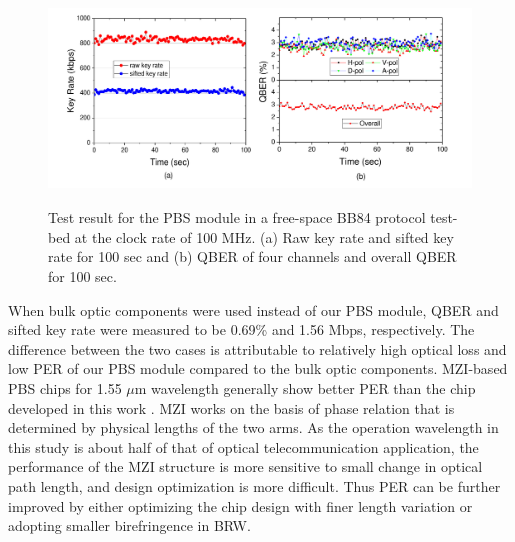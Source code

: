 \documentclass[letterpaper, 10pt]{article}
\begin{document}
\begin{figure}[ht]
  \centering
  \includegraphics[height=5.6cm]{QKD_result}
  \caption{Test result for the PBS module in a free-space BB84 protocol test-bed at the clock rate of 100 MHz. (a) Raw key rate and sifted key rate for 100 sec and (b) QBER of four channels and overall QBER for 100 sec.}
  \label{fig:QKD_result}
\end{figure}
When bulk optic components were used instead of our PBS module, QBER and sifted key rate were measured to be 0.69\% and 1.56 Mbps, respectively.
The difference between the two cases is attributable to relatively high optical loss and low PER of our PBS module compared to the bulk optic components.
MZI-based PBS chips for 1.55 $\mu$m wavelength generally show better PER than the chip developed in this work \cite{Hashizume:2015ta}.
MZI works on the basis of phase relation that is determined by physical lengths of the two arms.
As the operation wavelength in this study is about half of that of optical telecommunication application, the performance of the MZI structure is more sensitive to small change in optical path length, and design optimization is more difficult.
Thus PER can be further improved by either optimizing the chip design with finer length variation or adopting smaller birefringence in BRW.
\end{document}
